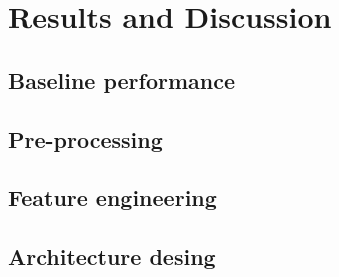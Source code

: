 \chapter{Results and Discussion}
\section{Baseline performance}
\section{Pre-processing}


\section{Feature engineering}
\section{Architecture desing}
